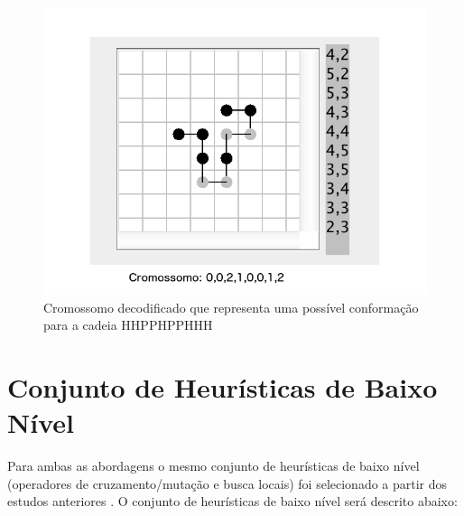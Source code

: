 \begin{figure}[!htb]
	\centering
	\includegraphics[scale=0.36]{Imagens/DecodedCromossome.png}
	\caption{Cromossomo decodificado que representa uma possível conformação para a cadeia HHPPHPPHHH}
	\label{img:cromossomo}
\end{figure}


\section{Conjunto de Heurísticas de Baixo Nível}

Para ambas as abordagens o mesmo conjunto de heurísticas de baixo nível (operadores de cruzamento/mutação e busca locais) foi selecionado a partir dos estudos anteriores \cite{custodio2014multiple, custodio2004investigation, garza2012locality,benitez2015algoritmo}. O conjunto de heurísticas de baixo nível será descrito abaixo:

